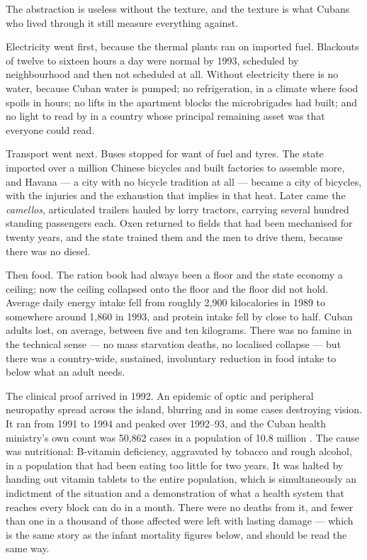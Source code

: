 The abstraction is useless without the texture, and the texture is what Cubans
who lived through it still measure everything against.

Electricity went first, because the thermal plants ran on imported fuel.
Blackouts of twelve to sixteen hours a day were normal by 1993, scheduled by
neighbourhood and then not scheduled at all. Without electricity there is no
water, because Cuban water is pumped; no refrigeration, in a climate where food
spoils in hours; no lifts in the apartment blocks the microbrigades had built;
and no light to read by in a country whose principal remaining asset was that
everyone could read.

Transport went next. Buses stopped for want of fuel and tyres. The state
imported over a million Chinese bicycles and built factories to assemble more,
and Havana --- a city with no bicycle tradition at all --- became a city of
bicycles, with the injuries and the exhaustion that implies in that heat. Later
came the \emph{camellos}, articulated trailers hauled by lorry tractors,
carrying several hundred standing passengers each. Oxen returned to fields that
had been mechanised for twenty years, and the state trained them and the men to
drive them, because there was no diesel.

Then food. The ration book had always been a floor and the state economy a
ceiling; now the ceiling collapsed onto the floor and the floor did not hold.
Average daily energy intake fell from roughly 2,900 kilocalories in 1989 to
somewhere around 1,860 in 1993, and protein intake fell by close to half.\unv{}
Cuban adults lost, on average, between five and ten kilograms. There was no
famine in the technical sense --- no mass starvation deaths, no localised
collapse --- but there was a country-wide, sustained, involuntary reduction in
food intake to below what an adult needs.

The clinical proof arrived in 1992. An epidemic of optic and peripheral
neuropathy spread across the island, blurring and in some cases destroying
vision. It ran from 1991 to 1994 and peaked over 1992--93, and the Cuban health
ministry's own count was 50,862 cases in a population of 10.8 million
\citep{mmwr1994}. The
cause was nutritional: B-vitamin deficiency, aggravated by tobacco and rough
alcohol, in a population that had been eating too little for two years. It was
halted by handing out vitamin tablets to the entire population, which is
simultaneously an indictment of the situation and a demonstration of what a
health system that reaches every block can do in a month. There were no deaths
from it, and fewer than one in a thousand of those affected were left with
lasting damage --- which is the same story as the infant mortality figures
below, and should be read the same way.

